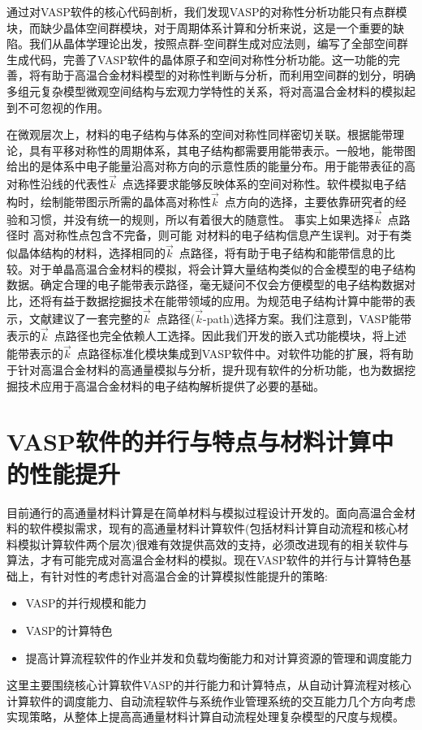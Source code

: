 通过对\textrm{VASP}软件的核心代码剖析，我们发现\textrm{VASP}的对称性分析功能只有点群模块，而缺少晶体空间群模块，对于周期体系计算和分析来说，这是一个重要的缺陷。我们从晶体学理论出发，按照点群-空间群生成对应法则，编写了全部空间群生成代码，完善了\textrm{VASP}软件的晶体原子和空间对称性分析功能。这一功能的完善，将有助于高温合金材料模型的对称性判断与分析，而利用空间群的划分，明确多组元复杂模型微观空间结构与宏观力学特性的关系，将对高温合金材料的模拟起到不可忽视的作用。

在微观层次上，材料的电子结构与体系的空间对称性同样密切关联。根据能带理论，具有平移对称性的周期体系，其电子结构都需要用能带表示。一般地，能带图给出的是体系中电子能量沿高对称方向的示意性质的能量分布。用于能带表征的高对称性沿线的代表性$\vec k$~点选择要求能够反映体系的空间对称性。软件模拟电子结构时，绘制能带图示所需的晶体高对称性$\vec k$~点方向的选择，主要依靠研究者的经验和习惯，并没有统一的规则，所以有着很大的随意性。%
事实上如果选择$\vec k$~点路径时%
高对称性点包含不完备，则可能%
对材料的电子结构信息产生误判。对于有类似晶体结构的材料，选择相同的$\vec k$~点路径，将有助于电子结构和能带信息的比较。对于单晶高温合金材料的模拟，将会计算大量结构类似的合金模型的电子结构数据。确定合理的电子能带表示路径，毫无疑问不仅会方便模型的电子结构数据对比，还将有益于数据挖掘技术在能带领域的应用。为规范电子结构计算中能带的表示，文献\cite{CMS49-299_2010}建议了一套完整的$\vec k$~点路径($\vec k$-\textrm{path})选择方案。我们注意到，\textrm{VASP}能带表示的$\vec k$~点路径也完全依赖人工选择。因此我们开发的嵌入式功能模块，将上述能带表示的$\vec k$~点路径标准化模块集成到\textrm{VASP}软件中。对软件功能的扩展，将有助于针对高温合金材料的高通量模拟与分析，提升现有软件的分析功能，也为数据挖掘技术应用于高温合金材料的电子结构解析提供了必要的基础。

\section{\rm{VASP}软件的并行与特点与材料计算中的性能提升}
目前通行的高通量材料计算是在简单材料与模拟过程设计开发的。面向高温合金材料的软件模拟需求，现有的高通量材料计算软件(包括材料计算自动流程和核心材料模拟计算软件两个层次)很难有效提供高效的支持，必须改进现有的相关软件与算法，才有可能完成对高温合金材料的模拟。现在\textrm{VASP}软件的并行与计算特色基础上，有针对性的考虑针对高温合金的计算模拟性能提升的策略:
\begin{itemize}
	\item \textrm{VASP}的并行规模和能力
	\item \textrm{VASP}的计算特色
	\item 提高计算流程软件的作业并发和负载均衡能力和对计算资源的管理和调度能力
\end{itemize}
这里主要围绕核心计算软件\textrm{VASP}的并行能力和计算特点，从自动计算流程对核心计算软件的调度能力、自动流程软件与系统作业管理系统的交互能力几个方向考虑实现策略，从整体上提高高通量材料计算自动流程处理复杂模型的尺度与规模。

